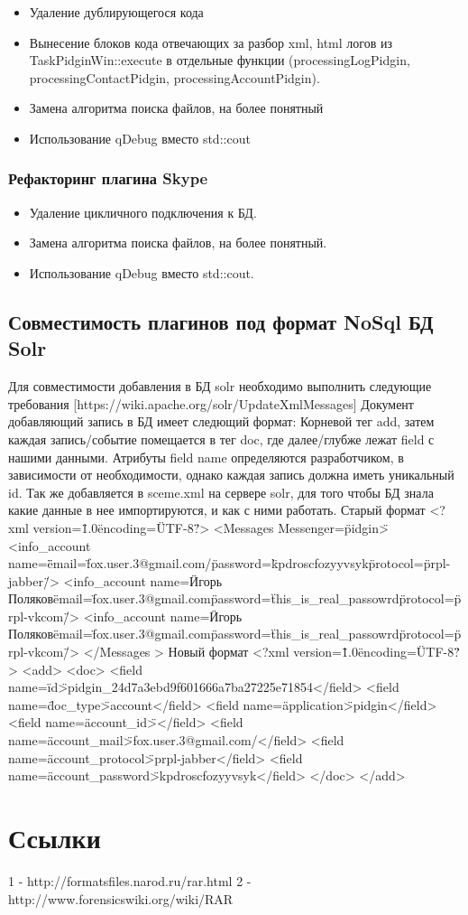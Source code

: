 \begin{itemize}
\item Удаление дублирующегося кода
\item Вынесение блоков кода отвечающих за разбор xml, html логов из TaskPidginWin::execute в отдельные функции (processingLogPidgin, processingContactPidgin, processingAccountPidgin).
\item Замена алгоритма поиска файлов, на более понятный
\item Использование qDebug вместо std::cout
\end{itemize}

\subsubsection{Рефакторинг плагина Skype}

\begin{itemize}
\item Удаление цикличного подключения к БД.
\item Замена алгоритма поиска файлов, на более понятный.
\item Использование qDebug вместо std::cout.
\end{itemize}

\subsection{Совместимость плагинов под формат NoSql БД Solr}

Для совместимости добавления в БД solr необходимо выполнить следующие требования
[https://wiki.apache.org/solr/UpdateXmlMessages]
Документ добавляющий запись в БД имеет следющий формат: 
Корневой тег add,  затем каждая запись/событие помещается в тег doc, где далее/глубже лежат field с нашими  данными. Атрибуты field name определяются разработчиком, в зависимости от необходимости, однако каждая запись должна иметь уникальный id. Так же добавляется в sceme.xml  на сервере solr, для того чтобы БД знала какие данные в нее импортируются, и как с ними работать.
Старый формат
<?xml version=\"1.0\" encoding=\"UTF-8\"?>
<Messages  Messenger=\"pidgin\">
    <info_account name=\"\" email=\"fox.user.3@gmail.com/\" password=\"kpdroscfozyyvsyk\" protocol=\"prpl-jabber\"/>
    <info_account name=\"Игорь Поляков\" email=\"fox.user.3@gmail.com\" password=\"this_is_real_passowrd\" protocol=\"prpl-vkcom\"/>
    <info_account name=\"Игорь Поляков\" email=\"fox.user.3@gmail.com\" password=\"this_is_real_passowrd\" protocol=\"prpl-vkcom\"/>
</Messages >
Новый формат
<?xml version=\"1.0\" encoding=\"UTF-8\"?>
<add>
    <doc>
        <field name=\"id\">pidgin_24d7a3ebd9f601666a7ba27225e71854</field>
        <field name=\"doc_type\">account</field>
        <field name=\"application\">pidgin</field>
        <field name=\"account_id\"></field>
        <field name=\"account_mail\">fox.user.3@gmail.com/</field>
        <field name=\"account_protocol\">prpl-jabber</field>
        <field name=\"account_password\">kpdroscfozyyvsyk</field>
    </doc>
</add>
\section{Ссылки}
1 - http://formatsfiles.narod.ru/rar.html
2 - http://www.forensicswiki.org/wiki/RAR